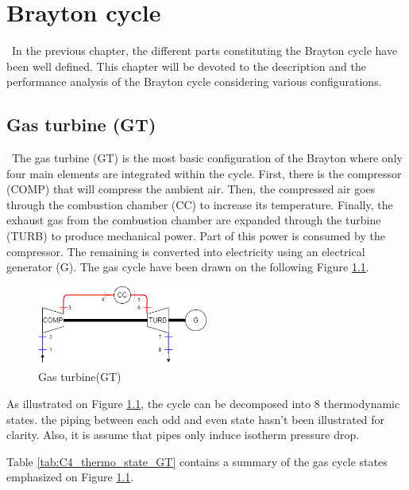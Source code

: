 \graphicspath{{Chapter_4_-_Brayton_cycle/Images/}}
\chapter{Brayton cycle}\label{C4}
\quad\, In the previous chapter, the different parts constituting the Brayton cycle have been well defined. This chapter will be devoted to the description and the performance analysis of the Brayton cycle considering various configurations.

\section{Gas turbine (GT)}
\quad\, The gas turbine (GT) is the most basic configuration of the Brayton where only four main elements are integrated within the cycle. First, there is the compressor (COMP) that will compress the ambient air. Then, the compressed air goes through the combustion chamber (CC) to increase its temperature. Finally, the exhaust gas from the combustion chamber are expanded through the turbine (TURB) to produce mechanical power. Part of this power is consumed by the compressor. The remaining is converted into electricity using an electrical generator (G). The gas cycle have been drawn on the following Figure \ref{fig:C4_BraytonGT}.

\begin{figure}[h]
\centering
\includegraphics[width=0.5\textwidth] {GT}
\caption{Gas turbine(GT)}
\label{fig:C4_BraytonGT}
\end{figure}



As illustrated on Figure \ref{fig:C4_BraytonGT}, the cycle can be decomposed into 8 thermodynamic states. the piping between each odd and even state hasn't been illustrated for clarity. Also, it is assume that pipes only induce isotherm pressure drop.

Table \ref{tab:C4_thermo_state_GT} contains a summary of the gas cycle states emphasized on Figure \ref{fig:C4_BraytonGT}.

